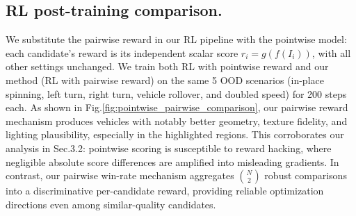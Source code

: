 \documentclass[runningheads]{llncs}
\begin{document}
\subsection{RL post-training comparison.}
We substitute the pairwise reward in our RL pipeline with the pointwise model: each candidate's reward is its independent scalar score $r_i = g(f(I_i))$, with all other settings unchanged. We train both RL with pointwise reward and our method (RL with pairwise reward) on the same 5 OOD scenarios (in-place spinning, left turn, right turn, vehicle rollover, and doubled speed) for 200 steps each. As shown in Fig.\ref{fig:pointwise_pairwise_comparison}, our pairwise reward mechanism produces vehicles with notably better geometry, texture fidelity, and lighting plausibility, especially in the highlighted regions. This corroborates our analysis in Sec.3.2: pointwise scoring is susceptible to reward hacking\cite{Pref-GRPO&UniGenBench}, where negligible absolute score differences are amplified into misleading gradients. In contrast, our pairwise win-rate mechanism aggregates $\binom{N}{2}$ robust comparisons into a discriminative per-candidate reward, providing reliable optimization directions even among similar-quality candidates.


%
\end{document}
